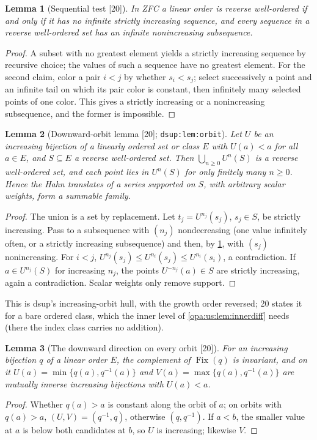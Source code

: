 \documentclass[11pt,oneside]{article}
\numberwithin{equation}{section}
\newtheorem{lemma}[lemma]{Lemma}
\theoremstyle{definition}
\theoremstyle{remark}
\newcommand{\Fix}{\operatorname{Fix}}
\newcommand{\src}[1]{\textup{\textsf{\small[#1]}}}
\newcommand{\lbl}[1]{\nolinkurl{#1}}
\begin{document}
\begin{lemma}[Sequential test \src{20}]\label{opa:us:lem:sequence}
In ZFC a linear order is reverse well-ordered if and only if it has no infinite strictly increasing sequence, and every sequence in a
reverse well-ordered set has an infinite nonincreasing subsequence.
\end{lemma}
\begin{proof}
A subset with no greatest element yields a strictly increasing sequence by recursive choice; the values of such a sequence have no greatest
element. For the second claim, color a pair $i<j$ by whether $s_i<s_j$; select successively a point and an infinite tail on which its pair
color is constant, then infinitely many selected points of one color. This gives a strictly increasing or a nonincreasing subsequence, and
the former is impossible.
\end{proof}

\begin{lemma}[Downward-orbit lemma \src{20}; \lbl{dsup:lem:orbit}]\label{opa:us:lem:downward}
Let $U$ be an increasing bijection of a linearly ordered set or class $E$ with $U(a)<a$ for all $a\in E$, and $S\subseteq E$ a reverse well-ordered
set. Then $\bigcup_{n\ge0}U^n(S)$ is a reverse well-ordered set, and each point lies in $U^n(S)$ for only finitely many $n\ge0$. Hence the Hahn
translates of a series supported on $S$, with arbitrary scalar weights, form a summable family.
\end{lemma}
\begin{proof}
The union is a set by replacement. Let $t_j=U^{n_j}(s_j)$, $s_j\in S$, be strictly increasing. Pass to a subsequence with $(n_j)$ nondecreasing
(one value infinitely often, or a strictly increasing subsequence) and then, by \cref{opa:us:lem:sequence}, with $(s_j)$ nonincreasing. For
$i<j$, $U^{n_j}(s_j)\le U^{n_i}(s_j)\le U^{n_i}(s_i)$, a contradiction. If $a\in U^{n_j}(S)$ for increasing $n_j$, the points $U^{-n_j}(a)\in S$ are
strictly increasing, again a contradiction. Scalar weights only remove support.
\end{proof}

This is dsup's increasing-orbit hull, with the growth order reversed; 20 states it for a bare ordered class, which the inner level of
\cref{opa:us:lem:innerdiff} needs (there the index class carries no addition).

\begin{lemma}[The downward direction on every orbit \src{20}]\label{opa:us:lem:minorbit}
For an increasing bijection $q$ of a linear order $E$, the complement of $\Fix(q)$ is invariant, and on it $U(a)=\min\{q(a),q^{-1}(a)\}$ and
$V(a)=\max\{q(a),q^{-1}(a)\}$ are mutually inverse increasing bijections with $U(a)<a$.
\end{lemma}
\begin{proof}
Whether $q(a)>a$ is constant along the orbit of $a$; on orbits with $q(a)>a$, $(U,V)=(q^{-1},q)$, otherwise $(q,q^{-1})$. If $a<b$, the smaller
value at $a$ is below both candidates at $b$, so $U$ is increasing; likewise $V$.
\end{proof}
\end{document}
